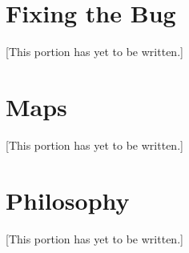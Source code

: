 \documentclass[12pt]{article}
\newcommand{\note}[1]{[This portion has yet to be written.]}
\newcounter{theorem}
\begin{document}
\appendix

\section{Fixing the Bug}

\note{Explain what is broken about the membership axiom. Outline some of the changes that need to be made to align the development here to proper NBG set theory,
going through how the membership axiom can be repaired, and what new axioms need to be introduced to let pretty much the same machinery run.
}

\section{Maps}

\note{Describe the category of sets and the theorems from the functions chapter that can be re-construed as properties of the category of sets.
Emphasize the importance of ``fixing the bug'' for the purpose of doing category theory.
Mention that there are many categories.}




\section{Philosophy}

\note{Provide references for interesting topics in the philosophy of mathematics that are approachable after studying the material here.}

\end{document}
